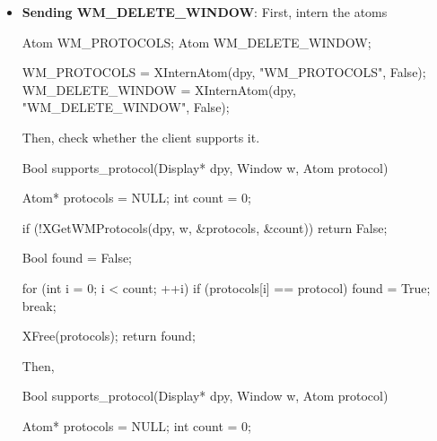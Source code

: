 \documentclass{report}
\begin{document}
\begin{itemize}
        \bigbreak \noindent 
        \texttt{message\_type} is the general category of the message. For ICCCM WM protocols, this is usually 
        \bigbreak \noindent 
        \begin{cppcode}
        WM_PROTOCOLS
        \end{cppcode}
        \bigbreak \noindent 
        For EWMH requests, this may be something like:
        \bigbreak \noindent 
        \begin{cppcode}
            _NET_ACTIVE_WINDOW
            _NET_WM_STATE
            _NET_CLOSE_WINDOW
        \end{cppcode}
        \bigbreak \noindent 
        \texttt{format} is the size of the data elements. \texttt{Data} is the payload. For ICCCM WM\_PROTOCOLS, the first value usually identifies the specific protocol. For example,
        \bigbreak \noindent 
        \begin{cppcode}
            data.l[0] = WM_DELETE_WINDOW;
            data.l[1] = timestamp;
        \end{cppcode}
    \item \textbf{Sending WM\_DELETE\_WINDOW}: First, intern the atoms
        \bigbreak \noindent 
        \begin{cppcode}
            Atom WM_PROTOCOLS;
            Atom WM_DELETE_WINDOW;

            WM_PROTOCOLS = XInternAtom(dpy, "WM_PROTOCOLS", False);
            WM_DELETE_WINDOW = XInternAtom(dpy, "WM_DELETE_WINDOW", False);
        \end{cppcode}
        \bigbreak \noindent 
        Then, check whether the client supports it.
        \bigbreak \noindent 
        \begin{cppcode}
            Bool supports_protocol(Display* dpy, Window w, Atom protocol) {
                Atom* protocols = NULL;
                int count = 0;

                if (!XGetWMProtocols(dpy, w, &protocols, &count))
                return False;

                Bool found = False;

                for (int i = 0; i < count; ++i) {
                    if (protocols[i] == protocol) {
                        found = True;
                        break;
                    }
                }

                XFree(protocols);
                return found;
            }
        \end{cppcode}
        \bigbreak \noindent 
        Then,
        \bigbreak \noindent 
        \begin{cppcode}
            Bool supports_protocol(Display* dpy, Window w, Atom protocol) {
                Atom* protocols = NULL;
                int count = 0;

}
\end{cppcode}
\end{itemize}
\end{document}
